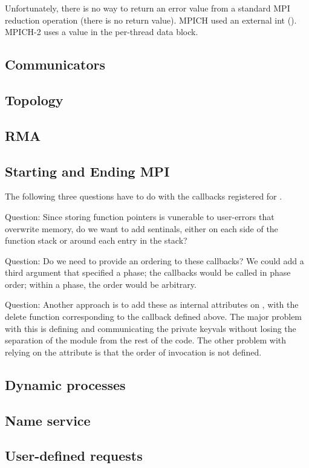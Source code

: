 \documentclass{article}
\begin{document}
Unfortunately, there is no way to return an error value from a standard MPI
reduction operation (there is no return value).  MPICH used an external int
().  MPICH-2 uses a value in the per-thread data block. 

\subsection{Communicators}
\subsection{Topology}
\subsection{RMA}  
\subsection{Starting and Ending MPI}

The following three questions have to do with the callbacks registered
for .

Question:
Since storing function pointers is vunerable to user-errors that
overwrite memory, do we want to add sentinals, either on each side of
the function stack or around each entry in the stack?

Question: 
Do we need to provide an ordering to these callbacks?  We could add a
third argument that specified a phase; the callbacks would be called
in phase order; within a phase, the order would be arbitrary.

Question:
Another approach is to add these as internal attributes on
, with the delete function corresponding to
the callback defined above. The major problem with this is defining
and communicating the private keyvals without losing the separation
of the module from the rest of the code.  The other problem with
relying on the attribute is that the order of invocation is not defined.

\subsection{Dynamic processes}
\subsection{Name service}
\subsection{User-defined requests}
\end{document}
